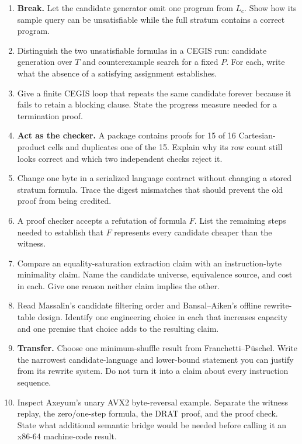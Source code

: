\begin{enumerate}
\item \textbf{Break.} Let the candidate generator omit one program from
\(L_c\). Show how its sample query can be unsatisfiable while the full stratum
contains a correct program.

\item Distinguish the two unsatisfiable formulas in a CEGIS run: candidate
generation over \(T\) and counterexample search for a fixed \(P\). For each,
write what the absence of a satisfying assignment establishes.

\item Give a finite CEGIS loop that repeats the same candidate forever because
it fails to retain a blocking clause. State the progress measure needed for a
termination proof.

\item \textbf{Act as the checker.} A package contains proofs for 15 of 16
Cartesian-product cells and duplicates one of the 15. Explain why its row count
still looks correct and which two independent checks reject it.

\item Change one byte in a serialized language contract without changing a
stored stratum formula. Trace the digest mismatches that should prevent the
old proof from being credited.

\item A proof checker accepts a refutation of formula \(F\). List the remaining
steps needed to establish that \(F\) represents every candidate cheaper than
the witness.

\item Compare an equality-saturation extraction claim with an instruction-byte
minimality claim. Name the candidate universe, equivalence source, and cost in
each. Give one reason neither claim implies the other.

\item Read Massalin's candidate filtering order and Bansal--Aiken's offline
rewrite-table design. Identify one engineering choice in each that increases
capacity and one premise that choice adds to the resulting claim.

\item \textbf{Transfer.} Choose one minimum-shuffle result from
Franchetti--Püschel. Write the narrowest candidate-language and lower-bound
statement you can justify from its rewrite system. Do not turn it into a claim
about every instruction sequence.

\item Inspect Axeyum's unary AVX2 byte-reversal example. Separate the witness
replay, the zero/one-step formula, the DRAT proof, and the proof check. State
what additional semantic bridge would be needed before calling it an x86-64
machine-code result.


\end{enumerate}
